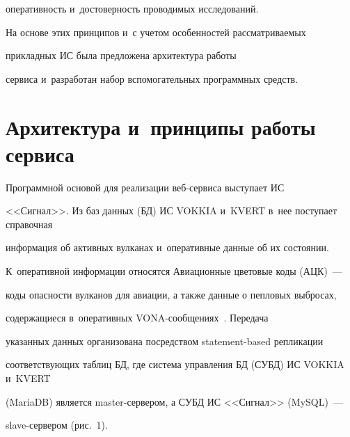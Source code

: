 оперативность и~достоверность проводимых исследований.


{





} 


     


     На основе этих принципов и~с учетом особенностей рассматриваемых 


прикладных ИС была предложена архитектура работы 


сервиса и~разработан набор вспомогательных программных средств. 





\vspace*{-2pt}





\section{Архитектура и~принципы работы сервиса}





\vspace*{-2pt}





     Программной основой для реализации веб-сер\-ви\-са выступает ИС 


<<Сигнал>>. Из баз данных (БД) ИС VOKKIA и~KVERT в~нее поступает справочная 


информация об активных вулканах и~оперативные данные об их состоянии. 


К~оперативной информации относятся Авиационные цветовые коды (АЦК)~--- 


коды опасности вулканов для авиации, а также данные о пепловых выбросах, 


содержащиеся в~оперативных VONA-со\-об\-ще\-ни\-ях~\cite{1-kor}. Передача 


указанных данных организована посредством statement-based репликации 


соответствующих таблиц БД, где система управления БД (СУБД) ИС VOKKIA и~KVERT 


(MariaDB) является master-сер\-ве\-ром, а СУБД ИС <<Сигнал>> (MySQL)~--- 


slave-сер\-ве\-ром (рис.~1).





